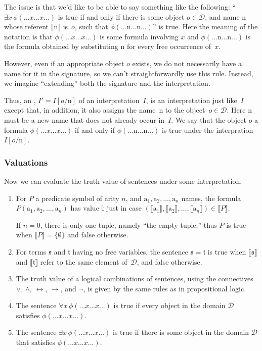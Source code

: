 \documentclass{article}
\newcommand{\tr}{\ensuremath{\mathbb{t}}} %
\newcommand{\nm}[1]{\mathrm{#1}} %
\newcommand{\var}[1]{\mathit{#1}} %
\newcommand{\term}[1]{\mathfrak{#1}} %
\newcommand{\interp}[1]{\lBrack#1\rBrack}
\begin{document}
The issue is that we'd like to be able to say something like the
following: ``$\exists\var{x}\,\phi(...\var{x}...\var{x}...)$ is true if and only
if there is some object $o\in\mathcal{D}$, and name $\nm{n}$ whose referent
$\interp{\nm{n}}$ is~$o$, such that $\phi(...\nm{n}...\nm{n}...)$'' is
true.  Here the meaning of the notation is that
$\phi(...\var{x}...\var{x}...)$ is some formula involving $\var{x}$ and
$\phi(...\nm{n}...\nm{n}...)$ is the formula obtained by substituting
$\nm{n}$ for every free occurrence of~$\var{x}$.

However, even if an appropriate object $o$ exists, we do not necessarily
have a name for it in the signature, so we can't straightforwardly use
this rule. Instead, we imagine ``extending'' both the signature and the
interpretation.

Thus, an , $I' = I[o/\nm{n}]$ of an interpretation~$I$,
is an interpretation just like~$I$ except that, in addition, it also
assigns the name~$\nm{n}$ to the object~$o\in\mathcal{D}$. Here $\nm{n}$ must be a
new name that does not already occur in~$I$. We say that the object $o$
 a formula $\phi(...\var{x}...\var{x}...)$ if and only if
$\phi(...\nm{n}...\nm{n}...)$ is true under the
interpration~$I[o/\nm{n}]$.

\subsubsection{Valuations}
Now we can evaluate the truth value of sentences under some interpretation.
\begin{enumerate}
\item For $P$ a predicate symbol of arity $n$, and
  $\nm{a}_1, \nm{a}_2, \dots, \nm{a}_n$ names, the formula
  $P(\nm{a}_1, \nm{a}_2, \dots, \nm{a}_n)$ has value $\tr$ just in case
  $(\interp{\nm{a}_1}, \interp{\nm{a}_2}, \dots, \interp{\nm{a}_n}) \in
  \interp{P}$.

  If $n=0$, there is only one tuple, namely ``the empty tuple;'' thus
  $P$ is true when $\interp{P}=\{\emptyset\}$ and false otherwise.
\item For terms $\term{s}$ and $\term{t}$ having no free variables, the sentence $\term{s}=\term{t}$ is true when $\interp{\term{s}}$ and $\interp{\term{t}}$ refer to the same element of~$\mathcal{D}$, and false otherwise.
\item The truth value of a logical combinations of sentences, using the
  connectives $\vee$, $\wedge$, $\leftrightarrow$, $\rightarrow$, and $\neg$, is given by the same rules as
  in propositional logic.
\item The sentence $\forall\var{x}\,\phi(...\var{x}...\var{x}...)$ is true if
  every object in the domain $\mathcal{D}$ satisfies $\phi(...\var{x}...\var{x}...)$.
\item The sentence $\exists\var{x}\,\phi(...\var{x}...\var{x}...)$ is true if there is some object in the domain $\mathcal{D}$ that satisfies $\phi(...\var{x}...\var{x}...)$. 
\end{enumerate}
\end{document}
